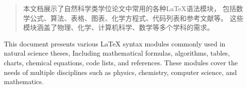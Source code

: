 \begin{abstract}

本文档展示了自然科学类学位论文中常用的各种LaTeX语法模块，
包括数学公式、算法、表格、图表、化学方程式、代码列表和参考文献等。
这些模块涵盖了物理、化学、计算机科学、数学等多个学科的需求。

\end{abstract}


\begin{englishabstract}
This document presents various LaTeX syntax modules commonly used in natural science theses,
Including mathematical formulas, algorithms, tables, charts, chemical equations, code lists, and references.
These modules cover the needs of multiple disciplines such as physics, chemistry, computer science, and mathematics.

\end{englishabstract}